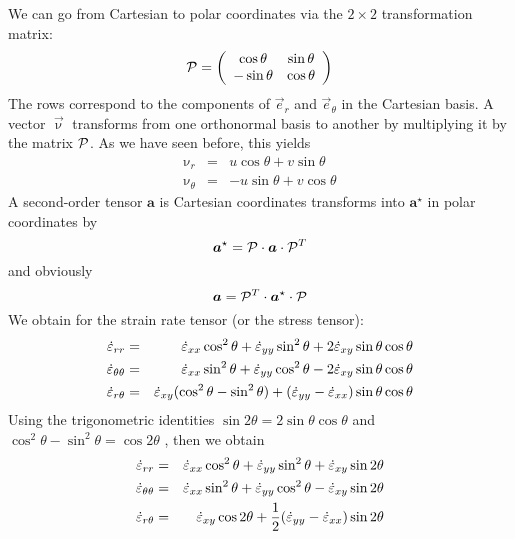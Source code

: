 We can go from Cartesian to polar coordinates  via the $2\times 2$ transformation matrix:
\begin{equation}
{\cal P}=
\left(
\begin{array}{ccc}
\cos\theta & \sin\theta \\
-\sin\theta & \cos\theta
\end{array}
\right)
\end{equation}
The rows correspond to the components of $\vec{e}_r$ and $\vec{e}_\theta$ in the Cartesian basis.
A vector $\vec{\upnu}$ transforms from one orthonormal basis to another by multiplying it by 
the matrix ${\cal P}$. As we have seen before, this yields
\begin{eqnarray}
\upnu_r &=& u \cos\theta + v \sin\theta \\
\upnu_\theta &=& -u \sin\theta + v \cos\theta
\end{eqnarray}
A second-order tensor ${\bm a}$ is Cartesian coordinates transforms into ${\bm a}^\star$
in polar coordinates by 
\[
{\bm a}^\star = {\cal P} \cdot {\bm a} \cdot {\cal P}^T
\]
and obviously 
\[
{\bm a} = {\cal P}^T \cdot {\bm a}^\star \cdot {\cal P}
\]
We obtain for the strain rate tensor (or the stress tensor):
\begin{eqnarray}
\dot{\varepsilon}_{rr} 
&=& \dot{\varepsilon}_{xx} \cos^2\theta + \dot{\varepsilon}_{yy} \sin^2\theta 
+ 2 \dot{\varepsilon}_{xy} \sin\theta\cos\theta \nonumber\\
\dot{\varepsilon}_{\theta\theta}
&=& \dot{\varepsilon}_{xx} \sin^2\theta + \dot{\varepsilon}_{yy} \cos^2\theta 
- 2 \dot{\varepsilon}_{xy} \sin\theta\cos\theta \nonumber\\
\dot{\varepsilon}_{r\theta} 
&=& \dot{\varepsilon}_{xy} (\cos^2\theta-\sin^2\theta) + 
(\dot{\varepsilon}_{yy} - \dot{\varepsilon}_{xx})\sin\theta \cos\theta \nonumber
\end{eqnarray}
Using the trigonometric identities $\sin 2\theta = 2 \sin\theta\cos\theta$
and $\cos^2\theta-\sin^2\theta = \cos 2\theta$
, then 
we obtain 
\begin{eqnarray}
\dot{\varepsilon}_{rr} 
&=& \dot{\varepsilon}_{xx} \cos^2\theta + \dot{\varepsilon}_{yy} \sin^2\theta 
+  \dot{\varepsilon}_{xy} \sin 2\theta \nonumber\\
\dot{\varepsilon}_{\theta\theta}
&=& \dot{\varepsilon}_{xx} \sin^2\theta + \dot{\varepsilon}_{yy} \cos^2\theta 
-  \dot{\varepsilon}_{xy} \sin 2\theta \nonumber\\
\dot{\varepsilon}_{r\theta} 
&=& \dot{\varepsilon}_{xy} \cos 2\theta + 
\frac12(\dot{\varepsilon}_{yy} - \dot{\varepsilon}_{xx}) \sin 2\theta  \nonumber
\end{eqnarray}




